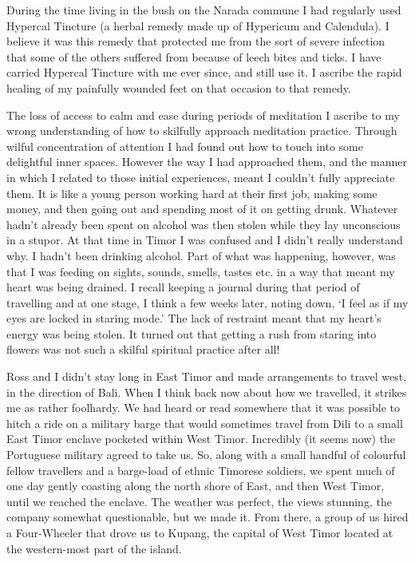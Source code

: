 During the time living in the bush on the Narada commune I had regularly
used Hypercal Tincture (a herbal remedy made up of Hypericum and
Calendula). I believe it was this remedy that protected me from the sort
of severe infection that some of the others suffered from because of
leech bites and ticks. I have carried Hypercal Tincture with me ever
since, and still use it. I ascribe the rapid healing of my painfully
wounded feet on that occasion to that remedy.

The loss of access to calm and ease during periods of meditation I
ascribe to my wrong understanding of how to skilfully approach
meditation practice. Through wilful concentration of attention I had
found out how to touch into some delightful inner spaces. However the
way I had approached them, and the manner in which I related to those
initial experiences, meant I couldn't fully appreciate them. It is like
a young person working hard at their first job, making some money, and
then going out and spending most of it on getting drunk. Whatever hadn't
already been spent on alcohol was then stolen while they lay unconscious
in a stupor. At that time in Timor I was confused and I didn't really understand why. I
hadn't been drinking alcohol. Part of what was happening, however, was that I was feeding on sights, sounds,
smells, tastes etc. in a way that meant my heart was being drained. I
recall keeping a journal during that period of travelling and at one
stage, I think a few weeks later, noting down, `I feel as if my eyes are
locked in staring mode.' The lack of restraint meant that my heart's
energy was being stolen. It turned out that getting a rush from staring
into flowers was not such a skilful spiritual practice after all!

Ross and I didn't stay long in East Timor and made arrangements to
travel west, in the direction of Bali. When I think back now about how
we travelled, it strikes me as rather foolhardy. We had heard or read
somewhere that it was possible to hitch a ride on a military barge that
would sometimes travel from Dili to a small East Timor enclave pocketed
within West Timor. Incredibly (it seems now) the Portuguese military
agreed to take us. So, along with a small handful of colourful fellow
travellers and a barge-load of ethnic Timorese soldiers, we spent much
of one day gently coasting along the north shore of East, and then West
Timor, until we reached the enclave. The weather was perfect, the views
stunning, the company somewhat questionable, but we made it. From there,
a group of us hired a Four-Wheeler that drove us to Kupang, the capital
of West Timor located at the western-most part of the island.

